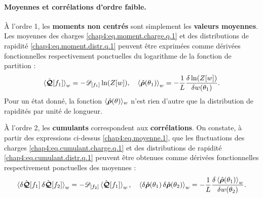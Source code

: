{ %
	\paragraph{Moyennes et corrélations d'ordre faible.}
À l'ordre 1, les {\bf moments non centrés} sont simplement les {\bf valeurs moyennes}. Les moyennes des charges \eqref{chap4:eq.moment.charge.q.1} et des distributions de rapidité \eqref{chap4:eq.moment.distr.q.1} peuvent être exprimées comme dérivées fonctionnelles respectivement ponctuelles  du logarithme de la fonction de partition :
\begin{eqnarray}\label{chap4:eq.moyenne.1}
	\braket{\hat{\bm{\mathcal{Q}}}[f_1]}_w   =  - \mathscr{D}_{[f_1]}  \ln(Z[w]), \quad \braket{\hat{\bm{\rho}}(\theta_1)}_w   =  - \frac{1}{L}\frac{\delta \ln(Z[w])}{\delta w(\theta_1)} .
\end{eqnarray}
Pour un état donné, la fonction $\langle \hat{\bm{\rho}}(\theta) \rangle_w$ n'est rien d'autre que la distribution de rapidités par unité de longueur.

\medskip

À l'ordre 2, les {\bf cumulants}  correspondent aux {\bf corrélations}. On constate, à partir des expressions ci-dessus \eqref{chap4:eq.moyenne.1}, que les fluctuations des charges \eqref{chap4:eq.cumulant.charge.q.1} et des distributions de rapidité \eqref{chap4:eq.cumulant.distr.q.1} peuvent être obtenues comme dérivées fonctionnelles respectivement ponctuelles des moyennes :
\begin{eqnarray}\label{chap4:eq.susceptibilite-fonctionnelle}
	\braket{\delta\hat{\bm{\mathcal{Q}}}[f_1] \, \delta \hat{\bm{\mathcal{Q}}}[f_2]}_w   =  - \mathscr{D}_{[f_2]}  \braket{\hat{\bm{\mathcal{Q}}}[f_1]}_w, \quad \braket{\delta\hat{\bm{\rho}}(\theta_1)\, \delta\hat{\bm{\rho}}(\theta_2)}_w   =  - \frac{1}{L} \frac{\delta  \braket{\hat{\bm{\rho}}(\theta_1)}_w }{\delta w(\theta_2)}.
\end{eqnarray}

}
